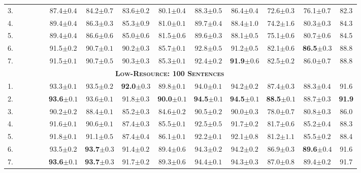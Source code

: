 \documentclass[11pt,a4paper]{article}
\newcommand{\cmark}{\textcolor{blue}{\ding{51}}}
\newcommand{\xmark}{\textcolor{red}{\ding{55}}}
\begin{document}
\begin{table*}[ht]
\begin{tabular}{l|cccc||cccccccc|c}
3. & \cmark & \xmark & \xmark & \xmark & 87.4$\pm0.4$ & 84.2$\pm0.7$ & 83.6$\pm0.2$ & 80.1$\pm0.4$ & 88.3$\pm0.5$ & 86.4$\pm0.4$ & 72.6$\pm0.3$ & 76.1$\pm0.7$ & 82.3 \\
4. & \cmark & \xmark & \cmark & \xmark & 89.4$\pm0.4$ & 86.3$\pm0.3$ & 85.3$\pm0.9$ & 81.0$\pm0.1$ & 89.7$\pm0.4$ & 88.4$\pm1.0$ & 74.2$\pm1.6$ & 80.3$\pm0.3$ & 84.3 \\
5. & \cmark & \xmark & \cmark & \cmark & 89.4$\pm0.4$ & 86.6$\pm0.6$ & 85.0$\pm0.6$ & 81.5$\pm0.6$ & 89.6$\pm0.3$ & 88.1$\pm0.5$ & 75.1$\pm0.6$ & 80.7$\pm0.6$ & 84.5 \\
6. & \cmark & \cmark & \cmark & \xmark & 91.5$\pm0.2$ & 90.7$\pm0.1$ & 90.2$\pm0.3$ & 85.7$\pm0.1$ & 92.8$\pm0.5$ & 91.2$\pm0.5$ & 82.1$\pm0.6$ & \textbf{86.5}$\pm0.3$ & 88.8 \\
7. & \cmark & \cmark & \cmark & \cmark & 91.5$\pm0.1$ & 90.7$\pm0.5$ & 90.3$\pm0.3$ & 85.3$\pm0.1$ & 92.4$\pm0.2$ & \textbf{91.9}$\pm0.6$ & 82.5$\pm0.2$ & 86.0$\pm0.7$ & 88.8 \\
\hline\hline
\multicolumn{13}{c}{\bf \textsc{Low-Resource: 100 Sentences}}\\
\hline
1. & \xmark & \cmark & \xmark & \xmark & 93.3$\pm0.1$ & 93.5$\pm0.2$ & \textbf{92.0}$\pm0.3$ & 89.8$\pm0.1$ & 94.0$\pm0.1$ & 94.2$\pm0.2$ & 87.4$\pm0.3$ & 88.3$\pm0.4$ & 91.6 \\
2. & \xmark & \cmark & \cmark & \xmark & \textbf{93.6}$\pm0.1$ & 93.6$\pm0.1$ & 91.8$\pm0.3$ & \textbf{90.0}$\pm0.1$ & \textbf{94.5}$\pm0.1$ & \textbf{94.5}$\pm0.1$ & \textbf{88.5}$\pm0.1$ & 88.7$\pm0.3$ & \textbf{91.9} \\
3. & \cmark & \xmark & \xmark & \xmark & 90.2$\pm0.2$ & 88.4$\pm0.1$ & 85.2$\pm0.3$ & 84.6$\pm0.2$ & 90.5$\pm0.2$ & 90.0$\pm0.3$ & 78.0$\pm0.7$ & 80.8$\pm0.3$ & 86.0 \\
4. & \cmark & \xmark & \cmark & \xmark & 91.6$\pm0.1$ & 90.6$\pm0.1$ & 87.4$\pm0.3$ & 85.5$\pm0.1$ & 92.5$\pm0.5$ & 91.7$\pm0.2$ & 81.7$\pm0.6$ & 85.2$\pm0.4$ & 88.3 \\
5. & \cmark & \xmark & \cmark & \cmark & 91.8$\pm0.1$ & 91.1$\pm0.5$ & 87.4$\pm0.4$ & 86.1$\pm0.1$ & 92.2$\pm0.1$ & 92.1$\pm0.8$ & 81.2$\pm1.1$ & 85.5$\pm0.2$ & 88.4 \\
6. & \cmark & \cmark & \cmark & \xmark & 93.5$\pm0.2$ & \textbf{93.7}$\pm0.3$ & 91.4$\pm0.2$ & 89.4$\pm0.6$ & 94.3$\pm0.2$ & 94.2$\pm0.2$ & 86.9$\pm0.3$ & \textbf{89.6}$\pm0.4$ & 91.6 \\
7. & \cmark & \cmark & \cmark & \cmark & \textbf{93.6}$\pm0.1$ & \textbf{93.7}$\pm0.3$ & 91.7$\pm0.2$ & 89.3$\pm0.6$ & 94.4$\pm0.1$ & 94.3$\pm0.3$ & 87.0$\pm0.8$ & 89.4$\pm0.2$ & 91.7 \\

\end{tabular}
\end{table*}
\end{document}
